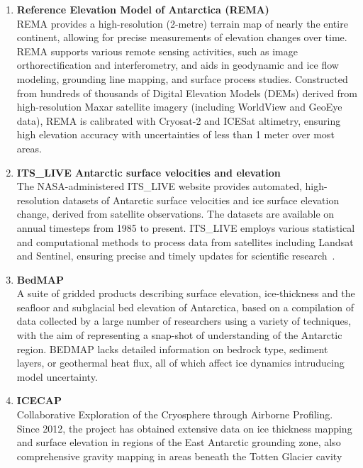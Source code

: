 \begin{enumerate}
    \item\textbf{Reference Elevation Model of Antarctica (REMA)}\\
    REMA provides a high-resolution (2-metre) terrain map of nearly the entire continent, allowing for precise measurements of elevation changes over time. REMA supports various remote sensing activities, such as image orthorectification and interferometry, and aids in geodynamic and ice flow modeling, grounding line mapping, and surface process studies. Constructed from hundreds of thousands of Digital Elevation Models (DEMs) derived from high-resolution Maxar satellite imagery (including WorldView and GeoEye data), REMA is calibrated with Cryosat-2 and ICESat altimetry, ensuring high elevation accuracy with uncertainties of less than 1 meter over most areas\cite{REMA}.

    \item\textbf{ITS\_LIVE Antarctic surface velocities and elevation}\\
    The NASA-administered ITS\_LIVE website provides automated, high-resolution datasets of Antarctic surface velocities and ice surface elevation change, derived from satellite observations. The datasets are available on annual timesteps from 1985 to present. ITS\_LIVE employs various statistical and computational methods to process data from satellites including Landsat and Sentinel, ensuring precise and timely updates for scientific research~\cite{itslive}.

    \item\textbf{BedMAP}\\ 
    A suite of gridded products describing surface elevation, ice-thickness and the seafloor and subglacial bed elevation of Antarctica, based on a compilation of data collected by a large number of researchers using a variety of techniques, with the aim of representing a snap-shot of understanding of the Antarctic region\cite{Fretwell_2013}. BEDMAP lacks detailed information on bedrock type, sediment layers, or geothermal heat flux, all of which affect ice dynamics intruducing model uncertainty.

    \item\textbf{ICECAP}\\ 
    Collaborative Exploration of the Cryosphere through Airborne Profiling. Since 2012, the project has obtained extensive data on ice thickness mapping and surface elevation in regions of the East Antarctic grounding zone, also comprehensive gravity mapping in areas beneath the Totten Glacier cavity\cite{ICECAP}
    

\end{enumerate}
